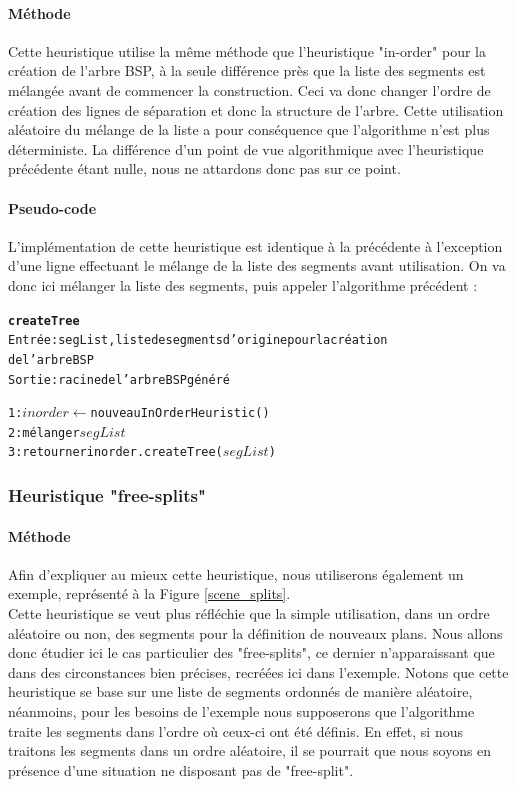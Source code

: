 \documentclass[11pt,a4paper]{article}
\theoremstyle{definition}
\theoremstyle{remark}
\begin{document}
\paragraph{Méthode}

Cette heuristique utilise la même méthode que l'heuristique "in-order" pour la création de l'arbre BSP, à la seule différence près que la liste des segments est mélangée avant de commencer la construction. Ceci va donc changer l'ordre de création des lignes de séparation et donc la structure de l'arbre. Cette utilisation aléatoire du mélange de la liste a pour conséquence que l'algorithme n'est plus déterministe. La différence d'un point de vue algorithmique avec l'heuristique précédente étant nulle, nous ne attardons donc pas sur ce point. 

\paragraph{Pseudo-code}

L'implémentation de cette heuristique est identique à la précédente à l'exception d'une ligne effectuant le mélange de la liste des segments avant utilisation. On va donc ici mélanger la liste des segments, puis appeler l'algorithme précédent :

\begin{alltt}
\textbf{createTree}
Entrée : segList, liste de segments d'origine pour la création 
de l'arbre BSP
Sortie : racine de l'arbre BSP généré

1: \(inorder \leftarrow\) nouveau InOrderHeuristic()
2: mélanger \(segList\)
3: retourner inorder.createTree(\(segList\))
\end{alltt}

\subsubsection{Heuristique "free-splits"}

\paragraph{Méthode}

Afin d'expliquer au mieux cette heuristique, nous utiliserons également un exemple, représenté à la Figure \ref{scene_splits}. \\

Cette heuristique se veut plus réfléchie que la simple utilisation, dans un ordre aléatoire ou non, des segments pour la définition de nouveaux plans. Nous allons donc étudier ici le cas particulier des "free-splits", ce dernier n'apparaissant que dans des circonstances bien précises, recréées ici dans l'exemple. Notons que cette heuristique se base sur une liste de segments ordonnés de manière aléatoire, néanmoins, pour les besoins de l'exemple nous supposerons que l'algorithme traite les segments dans l'ordre où ceux-ci ont été définis. En effet, si nous traitons les segments dans un ordre aléatoire, il se pourrait que nous soyons en présence d'une situation ne disposant pas de "free-split".
\end{document}
